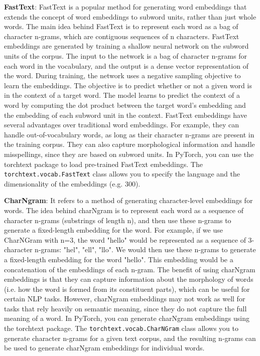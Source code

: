 \textbf{FastText}: FastText is a popular method for generating word embeddings that extends the concept of word embeddings to subword units, rather than just whole words. The main idea behind FastText is to represent each word as a bag of character n-grams, which are contiguous sequences of n characters. FastText embeddings are generated by training a shallow neural network on the subword units of the corpus. The input to the network is a bag of character n-grams for each word in the vocabulary, and the output is a dense vector representation of the word. During training, the network uses a negative sampling objective to learn the embeddings. The objective is to predict whether or not a given word is in the context of a target word. The model learns to predict the context of a word by computing the dot product between the target word's embedding and the embedding of each subword unit in the context. FastText embeddings have several advantages over traditional word embeddings. For example, they can handle out-of-vocabulary words, as long as their character n-grams are present in the training corpus. They can also capture morphological information and handle misspellings, since they are based on subword units. In PyTorch, you can use the torchtext package to load pre-trained FastText embeddings. The \verb|torchtext.vocab.FastText| class allows you to specify the language and the dimensionality of the embeddings (e.g. 300). \newline

\textbf{CharNgram}: It refers to a method of generating character-level embeddings for words. The idea behind charNgram is to represent each word as a sequence of character n-grams (substrings of length n), and then use these n-grams to generate a fixed-length embedding for the word. For example, if we use CharNGram with n=3, the word "hello" would be represented as a sequence of 3-character n-grams: "hel", "ell", "llo". We would then use these n-grams to generate a fixed-length embedding for the word "hello". This embedding would be a concatenation of the embeddings of each n-gram. The benefit of using charNgram embeddings is that they can capture information about the morphology of words (i.e. how the word is formed from its constituent parts), which can be useful for certain NLP tasks. However, charNgram embeddings may not work as well for tasks that rely heavily on semantic meaning, since they do not capture the full meaning of a word. In PyTorch, you can generate charNgram embeddings using the torchtext package. The \verb|torchtext.vocab.CharNGram| class allows you to generate character n-grams for a given text corpus, and the resulting n-grams can be used to generate charNgram embeddings for individual words. \newline

